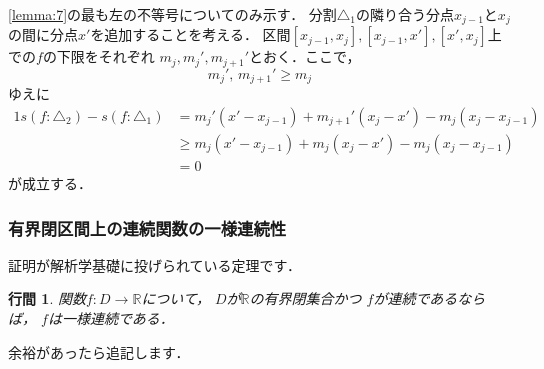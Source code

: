\documentclass{article}
\makeatletter
\renewenvironment{proof}[1][\proofname]{\par
        \pushQED{\qed}
        \normalfont
        \topsep6\p@\@plus6\p@ \trivlist
        \item[\hskip\labelsep{\bfseries #1}\@addpunct{\bfseries}]\ignorespaces
    }{%
        \popQED\endtrivlist\@endpefalse
    }
\renewcommand{\proofname}{\underline{証明.}}
\newtheorem{lemma}{行間}
\makeatother
\begin{document}
\begin{proof}
    \cref{lemma:7}の最も左の不等号についてのみ示す．
    分割$\triangle_1$の隣り合う分点$x_{j-1}$と$x_{j}$の間に分点$x'$を追加することを考える．
    区間$[x_{j-1}, x_{j}], [x_{j-1}, x'], [x', x_j]$上での$f$の下限をそれぞれ
    $m_j, m_j', m_{j+1}'$とおく．ここで，
    \begin{equation}
        m_j',\, m_{j+1}' \geq m_j
    \end{equation}
    ゆえに
    \begin{alignat}{1}
        s(f:\triangle_2) - s(f:\triangle_1) &=
            m_j' (x' - x_{j-1}) + m_{j+1}' (x_j - x') - m_j (x_j - x_{j-1}) \\
        &\geq
            m_j (x' - x_{j-1}) + m_j (x_j - x') - m_j (x_j - x_{j-1}) \\
        &=
            0
    \end{alignat}
    が成立する．
\end{proof}

\subsubsection{有界閉区間上の連続関数の一様連続性}
証明が解析学基礎に投げられている定理です．

\begin{screen}
    \begin{lemma}
        関数$f:D\rightarrow\mathbb{R}$について，
        $D$が$\mathbb{R}$の有界閉集合かつ
        $f$が連続であるならば，
        $f$は一様連続である．
    \end{lemma}
\end{screen}

\begin{proof}
    余裕があったら追記します．
\end{proof}
\end{document}
